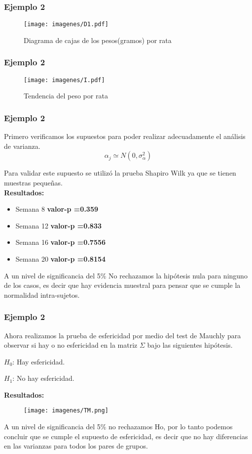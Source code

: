 \documentclass[12pt]{beamer}
\begin{document}
\begin{frame}
\frametitle{Ejemplo 2}
\begin{figure}[h!]
\caption{Diagrama de cajas de los pesos(gramos) por rata}
  \centering
  \texttt{[image: imagenes/D1.pdf]}
\end{figure}
\end{frame}

\begin{frame}
\frametitle{Ejemplo 2}
\begin{figure}[h!]
\caption{Tendencia del peso por rata}
  \centering
  \texttt{[image: imagenes/I.pdf]}
\end{figure}
\end{frame}

\begin{frame}
\frametitle{Ejemplo 2}
Primero verificamos los supuestos para poder realizar adecuadamente el análisis de varianza. 
 $$\alpha_j \simeq N(0,\sigma^2_\alpha)$$

Para validar este supuesto se utilizó la prueba Shapiro Wilk ya que se tienen muestras pequeñas.
~\\\textbf{Resultados:}
\begin{itemize}
\item[]Semana 8 \textbf{valor-p =0.359}
\item[]Semana 12 \textbf{valor-p =0.833}
\item[]Semana 16 \textbf{valor-p =0.7556}
\item[]Semana 20 \textbf{valor-p =0.8154}
\end{itemize}
A un nivel de significancia del 5\% No rechazamos la hipótesis nula para ninguno de los casos, es
decir que hay evidencia muestral para pensar que se cumple la normalidad intra-sujetos.
\end{frame}

\begin{frame}
\frametitle{Ejemplo 2}
Ahora realizamos la prueba de esfericidad por medio del test de Mauchly para observar si hay o no
esfericidad en la matriz $\Sigma$ bajo las siguientes hipótesis.
\begin{center}
$H_0$: Hay esfericidad.

$H_1$: No hay esfericidad.
\end{center}
\textbf{Resultados:}
\begin{figure}[h!]
  \centering
  \texttt{[image: imagenes/TM.png]}
\end{figure}
A un nivel de significancia del 5\% no rechazamos Ho, por lo tanto podemos concluir que se cumple
el supuesto de esfericidad, es decir que no hay diferencias en las varianzas para todos los pares
de grupos.
\end{frame}
\end{document}
